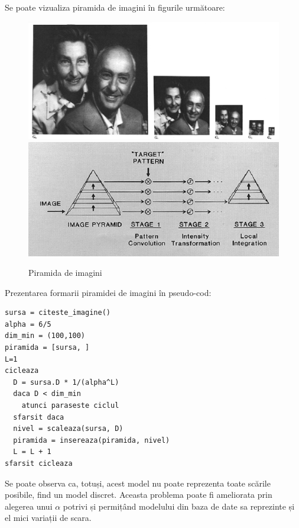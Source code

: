 Se poate vizualiza piramida de imagini în figurile următoare:

\begin{figure}[H]
	\centering
		\includegraphics[width=1.0\textwidth]{imagini/pyramid0.png}
		\includegraphics[width=1.0\textwidth]{imagini/pyramid1.png}
	\caption{Piramida de imagini\footnotemark}
	\label{fig:Pyramids_Tutorial_Pyramid_Theory}
\end{figure}



Prezentarea formarii piramidei de imagini în pseudo-cod:
\begin{mdframed}
\begin{verbatim}
sursa = citeste_imagine()
alpha = 6/5
dim_min = (100,100)
piramida = [sursa, ]
L=1
cicleaza
  D = sursa.D * 1/(alpha^L)
  daca D < dim_min
    atunci paraseste ciclul
  sfarsit daca
  nivel = scaleaza(sursa, D)
  piramida = insereaza(piramida, nivel)
  L = L + 1
sfarsit cicleaza
\end{verbatim}
\end{mdframed}

Se poate observa ca, totuși, acest model nu poate reprezenta toate scările posibile, find un model discret.
Aceasta problema poate fi ameliorata prin alegerea unui ${\alpha}$ potrivi și permițând modelului din baza de date sa reprezinte și el mici variații de scara.

